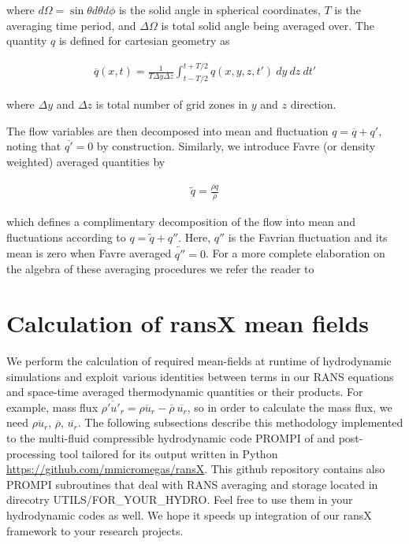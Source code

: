 \documentclass[11pt,paper=a4]{report}
\newcommand{\eht}{\overline}
\newcommand{\fht}{\widetilde}
\def\ff#1{#1''}
\begin{document}
\noindent where $d \Omega = \sin \theta d \theta d \phi$ is the solid angle in spherical coordinates, $T$ is the averaging time period, and $\Delta\Omega$ is total solid angle being averaged over. The quantity $q$ is defined for cartesian geometry as

\begin{align}\label{eq:eht}
\eht{q}(x,t) = \frac{1}{T \Delta y \Delta z}\int_{t- T/2}^{t+T/2} q(x,y,z,t')~dy~dz~dt'
\end{align}

\noindent where $\Delta y$ and $\Delta z$ is total number of grid zones in $y$ and $z$ direction.\\

\par The flow variables are then decomposed into mean and fluctuation $q = \eht{q} + q'$, noting that $\eht{q'} = 0$ by construction. Similarly, we introduce Favre (or density weighted) averaged quantities by 

\begin{align}
\fht{q} = \frac{\eht{\rho q}}{\eht{\rho}}
\end{align}

\noindent which defines a complimentary decomposition of the flow into mean and fluctuations according to $q = \fht{q} + \ff{q}$. Here, $\ff{q}$ is the Favrian fluctuation and its mean is zero when Favre averaged $\fht{\ff{q}} = 0$. For a more complete elaboration on the algebra of these averaging procedures we refer the reader to \citet{Chassaing2010}

\section{Calculation of ransX mean fields}

We perform the calculation of required mean-fields at runtime of hydrodynamic simulations and exploit various identities between terms in our RANS equations and space-time averaged thermodynamic quantities or their products. For example, mass flux $\eht{\rho'u'_r} = \eht{\rho u_r} - \eht{\rho} \ \eht{u_r} $, so in order to calculate the mass flux, we need $\eht{\rho u_r}$, $\eht{\rho}$, $\eht{u_r}$. The following subsections describe this methodology implemented to the multi-fluid compressible hydrodynamic code PROMPI of \citep{MeakinArnett2007} and post-processing tool tailored for its output written in Python \href{https://github.com/mmicromegas/ransX}{https://github.com/mmicromegas/ransX}. This github repository contains also PROMPI subroutines that deal with RANS averaging and storage located in direcotry UTILS/FOR\_YOUR\_HYDRO. Feel free to use them in your hydrodynamic codes as well. We hope it speeds up integration of our ransX framework to your research projects. 
\end{document}
